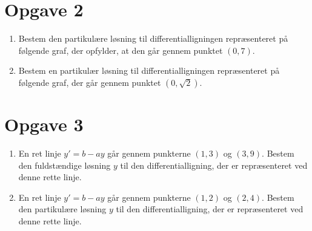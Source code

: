 \section*{Opgave 2}
\begin{enumerate}[label=\roman*)]
	\item Bestem den partikulære løsning til differentialligningen repræsenteret på følgende graf, der opfylder, at den 		    går gennem punktet $(0,7)$.
	\begin{center}
	\end{center}
	\item Bestem en partikulær løsning til differentialligningen repræsenteret på følgende graf, der går gennem punktet 
	$(0,\sqrt{2})$.
	\begin{center}
	\end{center}
\end{enumerate}
\section*{Opgave 3}
\begin{enumerate}[label=\roman*)]
	\item En ret linje $y' = b-ay$ går gennem punkterne $(1,3)$ og $(3,9)$. Bestem den fuldstændige løsning $y$ til den
	differentialligning, der er repræsenteret ved denne rette linje.
	\item En ret linje $y' = b-ay$ går gennem punkterne $(1,2)$ og $(2,4)$. Bestem den partikulære løsning $y$ til den 
	differentialligning, der er repræsenteret ved denne rette linje.
\end{enumerate}

